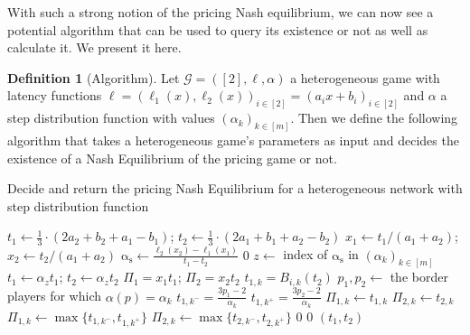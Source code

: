 \documentclass[10pt,a4paper]{book}
\newcommand{\as}{\mathrm{\alpha_s}}
\newcommand{\Gm}{\mathcal{G}}
\theoremstyle{definition}
\newtheorem{definition}{Definition}[chapter]
\theoremstyle{comment}
\begin{document}
With such a strong notion of the pricing Nash equilibrium, we can now see a potential algorithm that can be used to query its existence or not as well as calculate it.
We present it here.

\begin{definition}[Algorithm]
	\label{definition:algorithm:ne_pricing}
	Let $\Gm = ([2], \ell, \alpha)$ a heterogeneous game with latency functions $\ell = (\ell_1(x), \ell_2(x))_{i \in [2]} = (a_ix + b_i)_{i \in [2]}$ and $\alpha$ a step distribution function with values $(\alpha_k)_{k \in [m]}$.
	Then we define the following algorithm that takes a heterogeneous game's parameters as input and decides the existence of a Nash Equilibrium of the pricing game or not.

	\begin{algorithm}
		\caption{Decide and return the pricing Nash Equilibrium for a heterogeneous network with step distribution function}
		\label{algorithm:ne_pricing}
		\begin{algorithmic}[1]
			\State $t_1 \gets \frac13 \cdot (2 a_2 + b_2 + a_1 - b_1)$; $t_2 \gets \frac13 \cdot (2 a_1 + b_1 + a_2 - b_2)$
			\State $x_1 \gets t_1 / (a_1 + a_2)$; $x_2 \gets t_2 / (a_1 + a_2)$
			\State $\as \gets \frac{\ell_2(x_2) - \ell_1(x_1)}{t_1 - t_2}$
			\If{$\as \notin (\alpha_k)_{k \in [m]}$}
				\State \Return $0$
			\EndIf
			\State $z \gets$ index of $\as$ in $(\alpha_k)_{k \in [m]}$
			\State $t_1 \gets \alpha_z t_1$; $t_2 \gets \alpha_z t_2$
			\State $\Pi_1 = x_1 t_1$; $\Pi_2 = x_2 t_2$
				\State $t_{1, k} = B_{i, k}(t_2)$
				\State $p_1, p_2 \gets$ the border players for which $\alpha(p) = \alpha_k$
					\State $t_{1, k^-} = \frac{3p_1 - 2}{\alpha_k}$
					\State $t_{1, k^+} = \frac{3p_2 - 2}{\alpha_k}$
						\State $\Pi_{1, k} \gets t_{1, k}$
						\State $\Pi_{2, k} \gets t_{2, k}$
					\Else
						\State $\Pi_{1, k} \gets \max\{t_{1, k^-}, t_{1, k^+}\}$
						\State $\Pi_{2, k} \gets \max\{t_{2, k^-}, t_{2, k^+}\}$
					\EndIf
				\EndFor
					\State \Return $0$
				\EndIf
					\State \Return $0$
				\EndIf
			\EndFor
			\State \Return $(t_1, t_2)$
		\end{algorithmic}
	\end{algorithm}
\end{definition}
\end{document}
